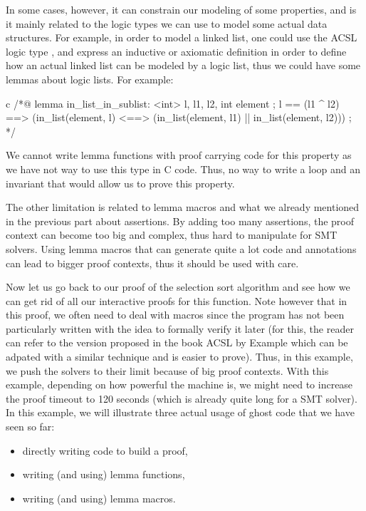 In some cases, however, it can constrain our modeling of some properties, and
is it mainly related to the logic types we can use to model some actual data
structures. For example, in order to model a linked list, one could use the
ACSL logic type , and express an
inductive or axiomatic definition in order to define how an actual linked list
can be modeled by a logic list, thus we could have some lemmas about logic
lists. For example:

\begin{CodeBlock}{c}
/*@
  lemma in_list_in_sublist:
    \forall \list<int> l, l1, l2, int element ;
      l == (l1 ^ l2) ==>
      (in_list(element, l) <==> (in_list(element, l1) || in_list(element, l2))) ;
*/
\end{CodeBlock}

We cannot write lemma functions with proof carrying code for this property as
we have not way to use this type in C code. Thus, no way to write a loop and
an invariant that would allow us to prove this property.


The other limitation is related to lemma macros and what we already mentioned
in the previous part about assertions. By adding too many assertions, the proof
context can become too big and complex, thus hard to manipulate for SMT
solvers. Using lemma macros that can generate quite a lot code and annotations
can lead to bigger proof contexts, thus it should be used with care.





Now let us go back to our proof of the selection sort algorithm and see how we
can get rid of all our interactive proofs for this function. Note however that
in this proof, we often need to deal with macros since the program has not been
particularly written with the idea to formally verify it later (for this, the
reader can refer to the version proposed in the book ACSL by Example which can
be adpated with a similar technique and is easier to prove). Thus, in
this example, we push the solvers to their limit because of big proof contexts.
With this example, depending on how powerful the machine is, we might need to
increase the proof timeout to 120 seconds (which is already quite long for a
SMT solver). In this example, we will illustrate three actual usage of ghost
code that we have seen so far:


\begin{itemize}
\item directly writing code to build a proof,
\item writing (and using) lemma functions,
\item writing (and using) lemma macros.
\end{itemize}


